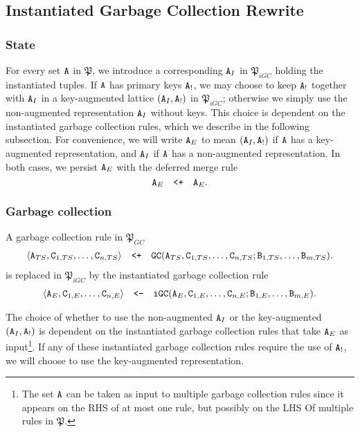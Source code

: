\subsection{Instantiated Garbage Collection Rewrite}

\subsubsection{State}
For every set $\tt{A}$ in $\mathfrak{P}$, we introduce a corresponding $\tt{A}_I$ in $\mathfrak{P}_{iGC}$ holding the instantiated tuples.
If $\tt{A}$ has primary keys $\tt{A}_!$, we may choose to keep $\tt{A}_!$ together with $\tt{A}_I$ in a key-augmented lattice $(\tt{A}_I, \tt{A}_!)$ in $\mathfrak{P}_{iGC}$;
otherwise we simply use the non-augmented representation $\tt{A}_I$ without keys.
This choice is dependent on the instantiated garbage collection rules, which we describe in the following subsection.
For convenience, we will write $\tt{A}_E$ to mean $(\tt{A}_I, \tt{A}_!)$ if $\tt{A}$ has a key-augmented representation, and $\tt{A}_I$ if $\tt{A}$ has a non-augmented representation.
In both cases, we persist $\tt{A}_E$ with the deferred merge rule
\[\tt{A}_E \quad\tt{<+}\quad \tt{A}_E.\]


\subsubsection{Garbage collection}
A garbage collection rule in $\mathfrak{P}_{GC}$
\begin{align*}
\langle \tt{A}_{TS}, \tt{C}_{1,TS}, \dots, \tt{C}_{n,TS} \rangle
\quad\tt{<+}\quad
\tt{GC}(\tt{A}_{TS}, \tt{C}_{1,TS}, \dots, \tt{C}_{n,TS}; \tt{B}_{1,TS}, \dots, \tt{B}_{m,TS}).
\end{align*}
is replaced in $\mathfrak{P}_{iGC}$ by the instantiated garbage collection rule
\begin{align*}
\langle \tt{A}_E, \tt{C}_{1,E}, \dots, \tt{C}_{n,E} \rangle
\quad\tt{<-}\quad
\tt{iGC}(\tt{A}_E, \tt{C}_{1,E}, \dots, \tt{C}_{n,E}; \tt{B}_{1,E}, \dots, \tt{B}_{m,E}).
\end{align*}

The choice of whether to use the non-augmented $\tt{A}_I$ or the key-augmented $(\tt{A}_I, \tt{A}_!)$ is dependent on the instantiated garbage collection rules that take $\tt{A}_E$ as input\footnote{
	The set $\tt{A}$ can be taken as input to multiple garbage collection rules since it appears on the RHS of at most one rule, but possibly on the LHS Of multiple rules in $\mathfrak{P}$.
}.
If any of these instantiated garbage collection rules require the use of $\tt{A}_!$, we will choose to use the key-augmented representation.

